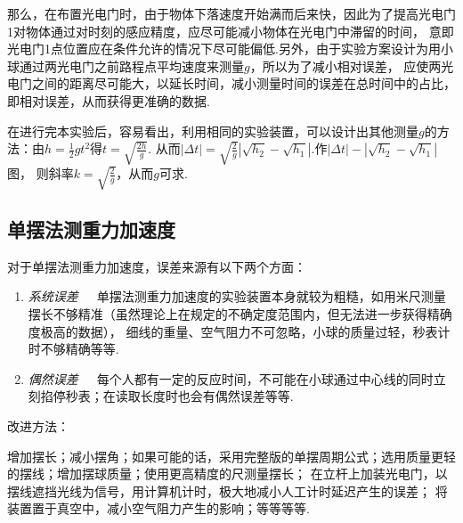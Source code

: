 \documentclass[a4paper]{article}%
\begin{document}
那么，在布置光电门时，由于物体下落速度开始满而后来快，因此为了提高光电门1对物体通过对时刻的感应精度，应尽可能减小物体在光电门中滞留的时间，
意即光电门1点位置应在条件允许的情况下尽可能偏低.另外，由于实验方案设计为用小球通过两光电门之前路程点平均速度来测量$g$，所以为了减小相对误差，
应使两光电门之间的距离尽可能大，以延长时间，减小测量时间的误差在总时间中的占比，即相对误差，从而获得更准确的数据.

在进行完本实验后，容易看出，利用相同的实验装置，可以设计出其他测量$g$的方法：由$h=\frac{1}{2}gt^2$得$t=\sqrt{\frac{2h}{g}}$.
从而$\left|\Delta t\right|=\sqrt{\frac{2}{g}}\left|\sqrt{h_2}-\sqrt{h_1}\right|$.作$\left|\Delta t\right|-\left|\sqrt{h_2}-\sqrt{h_1}\right|$图，
则斜率$k=\sqrt{\frac{2}{g}}$，从而$g$可求.

\subsection{单摆法测重力加速度}
对于单摆法测重力加速度，误差来源有以下两个方面：
\begin{enumerate}
    \item \emph{系统误差}~~~单摆法测重力加速度的实验装置本身就较为粗糙，如用米尺测量摆长不够精准（虽然理论上在规定的不确定度范围内，但无法进一步获得精确度极高的数据），
    细线的重量、空气阻力不可忽略，小球的质量过轻，秒表计时不够精确等等.
    \item \emph{偶然误差}~~~每个人都有一定的反应时间，不可能在小球通过中心线的同时立刻掐停秒表；在读取长度时也会有偶然误差等等.
\end{enumerate}
改进方法：

增加摆长；减小摆角；如果可能的话，采用完整版的单摆周期公式；选用质量更轻的摆线；增加摆球质量；使用更高精度的尺测量摆长；
在立杆上加装光电门，以摆线遮挡光线为信号，用计算机计时，极大地减小人工计时延迟产生的误差；
将装置置于真空中，减小空气阻力产生的影响；等等等等.
\end{document}
